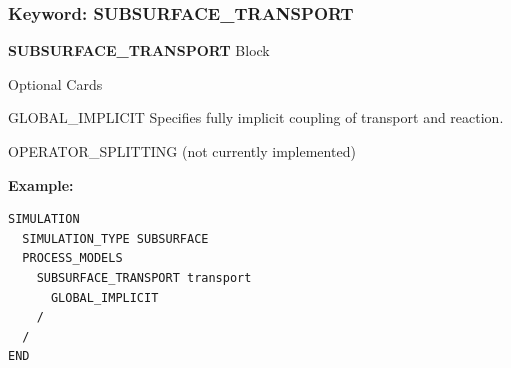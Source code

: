 \subsubsection{Keyword: SUBSURFACE\_TRANSPORT}

\begin{description}
\item {\bf SUBSURFACE\_TRANSPORT} Block
\begin{description}
\item Optional Cards
\item GLOBAL\_IMPLICIT
Specifies fully implicit coupling of transport and reaction.
\item OPERATOR\_SPLITTING (not currently implemented)
\end{description}
\end{description}

\small
\begin{mdframed}
{\bf Example:}
\footnotesize
\begin{verbatim}
SIMULATION
  SIMULATION_TYPE SUBSURFACE
  PROCESS_MODELS
    SUBSURFACE_TRANSPORT transport
      GLOBAL_IMPLICIT
    /
  /
END
\end{verbatim}
\normalsize
\end{mdframed}
\normalsize

\newpage
